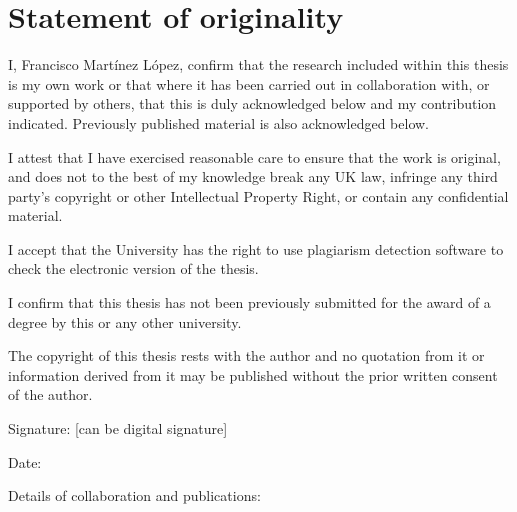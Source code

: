\chapter*{Statement of originality}
\label{C:Statement}

I, Francisco Mart\'{i}nez L\'{o}pez, confirm that the research included
within this thesis is my own work or that where it has been carried out in
collaboration with, or supported by others, that this is duly acknowledged
below and my contribution indicated. Previously published material is also
acknowledged below.

\bigskip

\noindent
I attest that I have exercised reasonable care to ensure that the work is
original, and does not to the best of my knowledge break any UK law, infringe any third party's copyright or other Intellectual Property Right, or contain any confidential material.

\bigskip

\noindent
I accept that the University has the right to use plagiarism detection software to check the electronic version of the thesis.

\bigskip

\noindent
I confirm that this thesis has not been previously submitted for the award of a degree by this or any other university.

\bigskip

\noindent
The copyright of this thesis rests with the author and no quotation from it or information derived from it may be published without the prior written consent of the author.

\bigskip

\noindent
Signature: [can be digital signature]

\noindent
Date:

\bigskip

\noindent
Details of collaboration and publications: 

